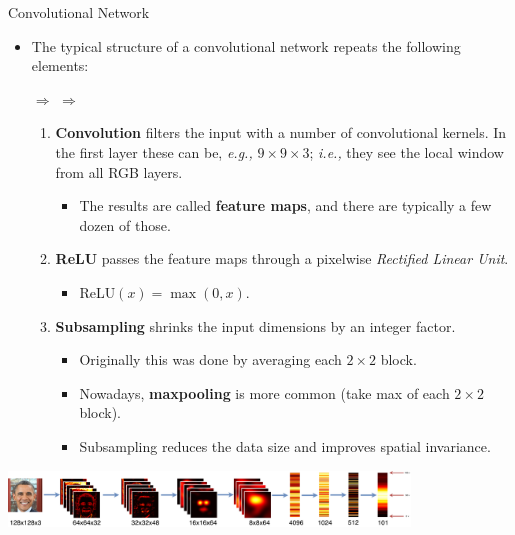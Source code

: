 \documentclass[10pt, aspectratio=169]{beamer} %
\begin{document}
\begin{frame}[fragile]{Convolutional Network}

	\begin{itemize}
		\item 	The typical structure of a convolutional network repeats the following elements:
		
			  $\Rightarrow$  $\Rightarrow$ 
			
		\begin{enumerate}
	
	\item \textbf{Convolution} filters the input with a number of convolutional kernels. In the first layer these
	can be, \emph{e.g.,} $9\times 9\times 3$; \emph{i.e.,} they see the local window from all RGB layers.
	\begin{itemize}
		\item The results are called \textbf{feature maps}, and there are typically a few dozen of those.
	\end{itemize}
	\item \textbf{ReLU} passes the feature maps through a pixelwise \textit{Rectified Linear Unit}.
	\begin{itemize}
		\item ReLU$(x)=\max(0,x)$.
			\end{itemize}
	\item \textbf{Subsampling} shrinks the input dimensions by an integer factor.
	\begin{itemize}
		\item Originally this was done by averaging each $2\times 2$ block.
		\item Nowadays,
		\textbf{maxpooling} is more common (take max of each $2\times 2$ block).
		\item Subsampling reduces the data size and improves spatial invariance.
			\end{itemize}
		\end{enumerate}
	\end{itemize}


\centerline{\includegraphics[width=0.8\textwidth]{Age_Network_visualization_detailed.pdf}}

\end{frame}
\end{document}
